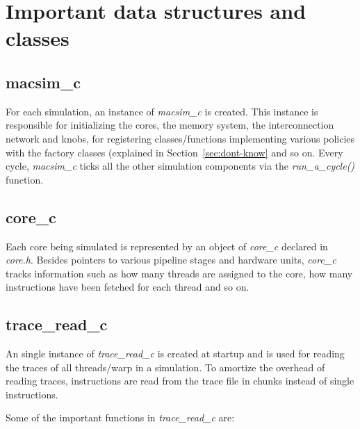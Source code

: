 \section{Important data structures and classes}


\subsection{macsim\_c}


For each simulation, an instance of \textit{macsim\_c} is created. This
instance is responsible for initializing the cores, the memory system, the
interconnection network and knobs, for registering classes/functions
implementing various policies with the factory classes (explained in
    Section~\ref{sec:dont-know} and so on. Every cycle, \textit{macsim\_c} ticks all
    the other simulation components via the \textit{run\_a\_cycle()} function.


\subsection{core\_c}

Each core being simulated is represented by an object of \textit{core\_c}
declared in \textit{core.h}. Besides pointers to various pipeline stages and
hardware units, \textit{core\_c} tracks information such as how many threads
are assigned to the core, how many instructions have been fetched for each
thread and so on.


\subsection{trace\_read\_c}

An single instance of \textit{trace\_read\_c} is created at startup and is used
for reading the traces of all threads/warp in a simulation. To amortize the
overhead of reading traces, instructions are read from the trace file in chunks
instead of single instructions.

Some of the important functions in \textit{trace\_read\_c} are:

